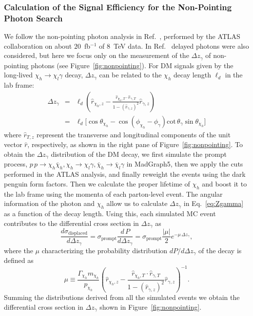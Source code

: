 \subsubsection{Calculation of the Signal Efficiency for the Non-Pointing Photon Search}
%
We follow the non-pointing photon analysis in Ref.~\cite{Aad:2014gfa}, performed
by the ATLAS collaboration on about $20$~fb$^{-1}$ of $8$~TeV data. In
Ref.~\cite{Aad:2014gfa} delayed photons were also considered, but here we focus
only on the measurement of the $\Delta z_{\gamma}$ of non-pointing photons (see
Figure~\ref{fig:nonpointing}). For DM signals given by the long-lived
$\chi_h\to\chi_l\gamma$ decay, $\Delta z_{\gamma}$ can be related to the
$\chi_h$ decay length $\ell_{d}$ in the lab frame:
\begin{eqnarray}\label{eq:Zgamma}
\Delta z_{\gamma}&=&\ell_d\left(\hat{r}_{\chi_h,z}-\frac{\hat{r}_{\chi_h,T}\cdot\hat{r}_{\gamma,T}}{1-(\hat{r}_{\gamma,z})^2}\hat{r}_{\gamma,z}\right)\nonumber\\
& =& \ell_d \Big[\cos\theta_{\chi_h} -\cos (\phi_{\chi_h} - \phi_\gamma)\mathrm{cot}\,\theta_\gamma \sin \theta_{\chi_h} \Big]
\end{eqnarray}
where $\hat{r}_{T,z}$ represent the transverse and longitudinal components of
the unit vector $\hat{r}$, respectively, as shown in
the right pane of Figure~\ref{fig:nonpointing}.
To obtain the $\Delta z_{\gamma}$ distribution of the DM decay, we first
simulate the prompt process, $p\,p \to \chi_h\bar{\chi}_h,
\chi_h\to\chi_l\gamma, \bar{\chi}_h\to\bar{\chi}_l\gamma$ in MadGraph5, then we
apply the cuts performed in the ATLAS analysis, and finally reweight the events
using the dark penguin form factors. Then we calculate the proper lifetime of
$\chi_h$ and boost it to the lab frame using the momenta of each parton-level
event. The angular information of the photon and $\chi_h$ allow us to calculate
$\Delta z_{\gamma}$ in Eq.~\eqref{eq:Zgamma} as a function of the decay length.
Using this, each simulated MC event contributes to the differential cross
section in $\Delta z_{\gamma}$ as
\begin{equation} \label{eq:displdistr}
\frac{d\sigma_{\text{displaced}}}{d\Delta z_{\gamma}} =\sigma_{\text{prompt}}\frac{d\,P}{d\Delta z_{\gamma}}=\sigma_{\text{prompt}}\frac{|\mu|}{2} e^{-\mu\,\Delta z_{\gamma}},
\end{equation}
where the $\mu$ characterizing the probability distribution $dP/d\Delta z_\gamma$ of the decay is defined as
\begin{equation}
\mu\equiv\frac{\Gamma_{\chi_h}m_{\chi_h}}{p_{\chi_h}}\left(\hat{r}_{\chi_h,z}-\frac{\hat{r}_{\chi_h,T}\cdot\hat{r}_{\gamma,T}}{1-(\hat{r}_{\gamma,z})^2}\hat{r}_{\gamma,z}\right)^{-1}.
\end{equation}
Summing the distributions derived from all the simulated events we obtain the
differential cross section in $\Delta z_\gamma$ shown in Figure~\ref{fig:nonpointing}.

